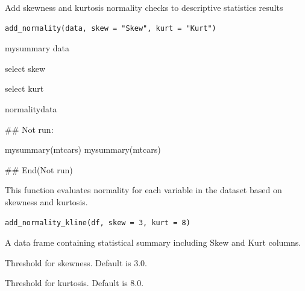 \documentclass[a4paper]{book}
\begin{document}
%
\begin{Description}
Add skewness and kurtosis normality checks to descriptive statistics results
\end{Description}
%
\begin{Usage}
\begin{verbatim}
add_normality(data, skew = "Skew", kurt = "Kurt")
\end{verbatim}
\end{Usage}
%
\begin{Arguments}
\begin{ldescription}
\item[\code{data}] mysummary data

\item[\code{skew}] select skew

\item[\code{kurt}] select kurt
\end{ldescription}
\end{Arguments}
%
\begin{Value}
normalitydata
\end{Value}
%
\begin{Examples}
\begin{ExampleCode}

## Not run: 

mysummary(mtcars)
mysummary(mtcars)%



## End(Not run)

\end{ExampleCode}
\end{Examples}
%
\begin{Description}
This function evaluates normality for each variable in the dataset based on skewness and kurtosis.
\end{Description}
%
\begin{Usage}
\begin{verbatim}
add_normality_kline(df, skew = 3, kurt = 8)
\end{verbatim}
\end{Usage}
%
\begin{Arguments}
\begin{ldescription}
\item[\code{df}] A data frame containing statistical summary including Skew and Kurt columns.

\item[\code{skew}] Threshold for skewness. Default is 3.0.

\item[\code{kurt}] Threshold for kurtosis. Default is 8.0.
\end{ldescription}
\end{Arguments}
\end{document}
